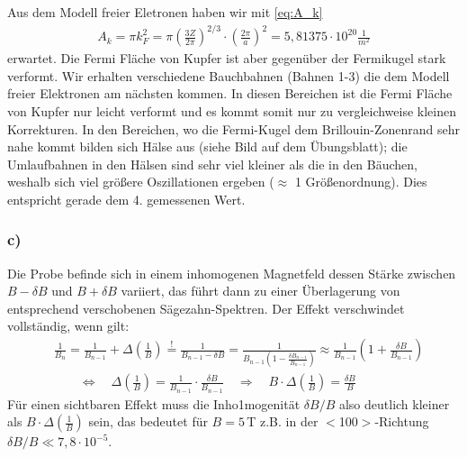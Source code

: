 Aus dem Modell freier Eletronen haben wir mit \eqref{eq:A_k} 
\begin{align*}
 A_k = \pi k_F^2 = \pi \left(\frac{3 Z}{2 \pi} \right)^{2/3} \cdot \left(\frac{2 \pi}{a} \right)^2 = 5,81375\cdot 10^{20}   
 \frac{1}{m^2}
\end{align*}
erwartet.
Die Fermi Fläche von Kupfer ist aber gegenüber der Fermikugel stark verformt.
Wir erhalten verschiedene Bauchbahnen (Bahnen 1-3) die dem Modell freier Elektronen am nächsten kommen.
In diesen Bereichen ist die Fermi Fläche von Kupfer nur leicht
verformt und es kommt somit nur zu vergleichweise kleinen Korrekturen.
In den Bereichen, wo die Fermi-Kugel dem Brillouin-Zonenrand sehr nahe kommt bilden sich
Hälse aus (siehe Bild auf dem Übungsblatt); die Umlaufbahnen in den Hälsen sind
sehr viel kleiner als die in den Bäuchen, weshalb sich viel größere Oszillationen ergeben
($\approx$ 1 Größenordnung). Dies entspricht gerade dem 4. gemessenen Wert.

\subsubsection*{c)}
Die Probe befinde sich in einem inhomogenen Magnetfeld dessen Stärke zwischen
$B - \delta B$ und $B + \delta B$ variiert, das führt dann zu einer Überlagerung
von entsprechend verschobenen Sägezahn-Spektren. Der Effekt verschwindet vollständig,
wenn gilt:
\begin{align*}
  & \frac{1}{B_n} = \frac{1}{B_{n-1}} +  \Delta \left(\frac 1B\right) \overset{!}=
  \frac{1}{B_{n-1} - \delta B} = \frac{1}{B_{n-1} \left(1 - \frac{\delta B_{n-1}}{B_{n-1}}\right)}
  \approx \frac{1}{B_{n-1}} \left(1  + \frac{\delta B}{B_{n-1}} \right)\\
  & \qquad \Leftrightarrow \quad \Delta \left(\frac 1B\right) =
    \frac{1}{B_{n-1}} \cdot \frac{\delta B}{B_{n-1}}
    \quad \Rightarrow \quad B \cdot \Delta \left(\frac 1B\right) = \frac{\delta B}{B}
\end{align*}
Für einen sichtbaren Effekt muss die Inho1mogenität $\delta B / B$ also deutlich
kleiner als $B \cdot \Delta \left(\frac 1B\right)$ sein, das bedeutet für
$B=5\,$T z.B. in der $<$100$>$-Richtung $\delta B / B \ll 7{,}8 \cdot 10^{-5}$.
